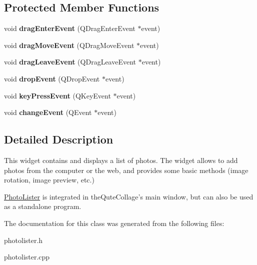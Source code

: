 \subsection*{Protected Member Functions}
\begin{DoxyCompactItemize}
\item 
\hypertarget{class_photo_lister_a97d747f553642b346bda6c9ebfcd5518}{
void {\bfseries dragEnterEvent} (QDragEnterEvent $\ast$event)}
\label{class_photo_lister_a97d747f553642b346bda6c9ebfcd5518}

\item 
\hypertarget{class_photo_lister_aee1bbcb6b771cb329f9ca283081a9190}{
void {\bfseries dragMoveEvent} (QDragMoveEvent $\ast$event)}
\label{class_photo_lister_aee1bbcb6b771cb329f9ca283081a9190}

\item 
\hypertarget{class_photo_lister_a561c938e5a08d1dadab6a8a7feda2685}{
void {\bfseries dragLeaveEvent} (QDragLeaveEvent $\ast$event)}
\label{class_photo_lister_a561c938e5a08d1dadab6a8a7feda2685}

\item 
\hypertarget{class_photo_lister_a4cdd16d165fea01d5dcdbce3d79e7f23}{
void {\bfseries dropEvent} (QDropEvent $\ast$event)}
\label{class_photo_lister_a4cdd16d165fea01d5dcdbce3d79e7f23}

\item 
\hypertarget{class_photo_lister_a9febcbeb507231404ca0b36e019ac8fb}{
void {\bfseries keyPressEvent} (QKeyEvent $\ast$event)}
\label{class_photo_lister_a9febcbeb507231404ca0b36e019ac8fb}

\item 
\hypertarget{class_photo_lister_a4234baf4d9ee4af015efec9aa53bc035}{
void {\bfseries changeEvent} (QEvent $\ast$event)}
\label{class_photo_lister_a4234baf4d9ee4af015efec9aa53bc035}

\end{DoxyCompactItemize}


\subsection{Detailed Description}
This widget contains and displays a list of photos. The widget allows to add photos from the computer or the web, and provides some basic methods (image rotation, image preview, etc.)

\hyperlink{class_photo_lister}{PhotoLister} is integrated in theQuteCollage's main window, but can also be used as a standalone program. 

The documentation for this class was generated from the following files:\begin{DoxyCompactItemize}
\item 
photolister.h\item 
photolister.cpp\end{DoxyCompactItemize}
